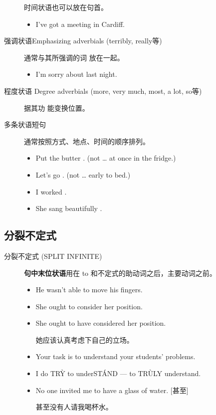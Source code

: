 \begin{description}
  时间状语也可以放在句首。
  \begin{itemize}
  \item {} I've got a meeting in Cardiff.
  \end{itemize}

\item[强调状语Emphasizing adverbials (terribly, really等)] 通常与其所强调的词
  放在一起。
  \begin{itemize}
  \item I'm  sorry about last night.
  \end{itemize}

\item[程度状语 Degree adverbials (more, very much, most, a lot, so等)] 据其功
  能变换位置。

\item[多条状语短句] 通常按照方式、地点、时间的顺序排列。
  \begin{itemize}
  \item Put the butter  . (not … at once in the fridge.)
  \item Let's go  . (not … early to bed.)
  \item I worked  .
  \item She sang beautifully  .
  \end{itemize}
\end{description}

\subsection{分裂不定式}
\label{subsubsec:splitinf}

\begin{description}
\item[分裂不定式 (SPLIT INFINITE)] 
  \textbf{句中末位状语}用在 to 和不定式的助动词之后，主要动词之前。
  \begin{itemize}
  \item He wasn't able to  move his fingers.
  \item She ought to  consider her position.
  \item She ought to have  considered her position.

    她应该认真考虑下自己的立场。

  \item Your task is to  understand your students' problems.
  \item I do TR\`Y to underST\'AND --- to TR\`ULY understand.

  \item No one invited me to  have a glass of water. [甚至]

    甚至没有人请我喝杯水。
  \end{itemize}
\end{description}

